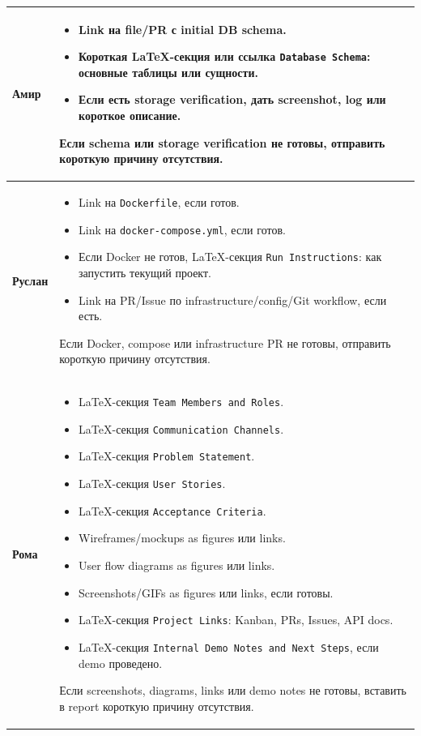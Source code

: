 \documentclass[12pt,a4paper]{article}
\begin{document}
\begin{longtable}{|p{}|p{}|}
\textbf{Амир} &
\begin{itemize}
    \item Link на file/PR с initial DB schema.
    \item Короткая LaTeX-секция или ссылка \texttt{Database Schema}: основные таблицы или сущности.
    \item Если есть storage verification, дать screenshot, log или короткое описание.
\end{itemize}
Если schema или storage verification не готовы, отправить короткую причину отсутствия. \\
\hline

\textbf{Руслан} &
\begin{itemize}
    \item Link на \texttt{Dockerfile}, если готов.
    \item Link на \texttt{docker-compose.yml}, если готов.
    \item Если Docker не готов, LaTeX-секция \texttt{Run Instructions}: как запустить текущий проект.
    \item Link на PR/Issue по infrastructure/config/Git workflow, если есть.
\end{itemize}
Если Docker, compose или infrastructure PR не готовы, отправить короткую причину отсутствия. \\
\hline

\textbf{Рома} &
\begin{itemize}
    \item LaTeX-секция \texttt{Team Members and Roles}.
    \item LaTeX-секция \texttt{Communication Channels}.
    \item LaTeX-секция \texttt{Problem Statement}.
    \item LaTeX-секция \texttt{User Stories}.
    \item LaTeX-секция \texttt{Acceptance Criteria}.
    \item Wireframes/mockups as figures или links.
    \item User flow diagrams as figures или links.
    \item Screenshots/GIFs as figures или links, если готовы.
    \item LaTeX-секция \texttt{Project Links}: Kanban, PRs, Issues, API docs.
    \item LaTeX-секция \texttt{Internal Demo Notes and Next Steps}, если demo проведено.
\end{itemize}
Если screenshots, diagrams, links или demo notes не готовы, вставить в report короткую причину отсутствия. \\
\hline

\end{longtable}
\end{document}
